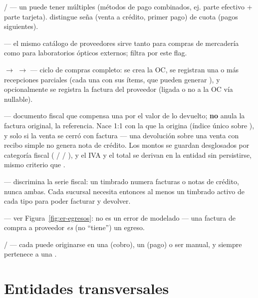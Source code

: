  /  --- un  puede tener múltiples  (métodos de pago combinados, ej. parte efectivo + parte tarjeta).  distingue seña (venta a crédito, primer pago) de cuota (pagos siguientes).

\allowbreak {} --- el mismo catálogo de proveedores sirve tanto para compras de mercadería como para laboratorios ópticos externos; \allowbreak {} filtra por este flag.

 $\to$ \allowbreak {} $\to$  --- ciclo de compras completo: se crea la OC, se registran una o más recepciones parciales (cada una con sus ítems, que pueden generar ), y opcionalmente se registra la factura del proveedor (ligada o no a la OC vía  nullable).

 --- documento fiscal que compensa una  por el valor de lo devuelto; \textbf{no} anula la factura original, la referencia. Nace 1:1 con la  que la origina (índice único sobre ), y solo si la venta se cerró con factura --- una devolución sobre una venta con recibo simple no genera nota de crédito. Los montos se guardan desglosados por categoría fiscal (\allowbreak {} / \allowbreak {} / \allowbreak {}), y el IVA y el total se derivan en la entidad sin persistirse, mismo criterio que .

 --- discrimina la serie fiscal: un timbrado numera facturas o notas de crédito, nunca ambas. Cada sucursal necesita entonces al menos un timbrado activo de cada tipo para poder facturar y devolver.

 --- ver Figura~\ref{fig:er-egresos}:  no es un error de modelado --- una factura de compra a proveedor \emph{es} (no ``tiene'') un egreso.

 /  --- cada  puede originarse en una  (cobro), un  (pago) o ser manual, y siempre pertenece a una .

\section{Entidades transversales}
\label{sec:modelo-transversales}

